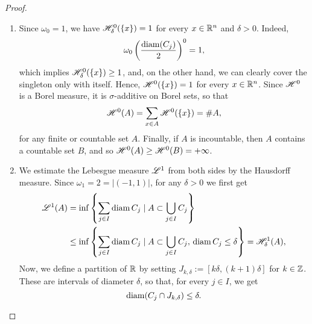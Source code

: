\begin{proof}~
\begin{enumerate}[(1)]
\item Since $\omega_0 = 1$, we have $\mathscr{H}^{0}_{\delta}(\{x\}) = 1$ for every $x \in \mathbb{R}^{n}$ and $\delta > 0$. Indeed, 
$$\omega_{0} \left(\frac{\operatorname{diam}(C_j)}{2}\right)^0 = 1,$$
which implies $\mathscr{H}^{0}_{\delta}(\{x\}) \ge 1$, and, on the other hand, we can clearly cover the singleton only with itself. Hence, $\mathscr{H}^{0}(\{x\}) = 1$ for every $x \in \mathbb{R}^{n}$. Since $\mathscr{H}^{0}$ is a Borel measure, it is $\sigma$-additive on Borel sets, so that
$$ \mathscr{H}^{0}(A) = \sum_{x \in A} \mathscr{H}^{0}(\{x\}) = \# A, $$
for any finite or countable set $A$. Finally, if $A$ is incountable, then $A$ contains a countable set $B$, and so $\mathscr{H}^{0}(A) \ge \mathscr{H}^{0}(B) = + \infty$.
\item We estimate the Lebesgue measure $\mathscr{L}^{1}$ from both sides by the
Hausdorff measure. Since $\omega_1 = 2 = |(-1,1)|$, for any $\delta > 0$ we first get 
\[
\begin{aligned}
\mathscr{L}^{1}(A) 
&= \inf \left\{ \sum_{j\in I} \operatorname{diam} C_j \mid A \subset \bigcup_{j\in I} C_j \right\}
\\ & \leq 
\inf \left\{ \sum_{j\in I} \operatorname{diam} C_j \mid A \subset \bigcup_{j\in I} C_j, \,
\operatorname{diam} C_j \leq \delta \right\}
= 
\mathscr{H}^{1}_\delta(A),
\end{aligned}
\]
Now, we define a partition of $\mathbb{R}$ by setting $J_{k,\delta} := [k\delta, (k+1)\delta]$
for $k \in \mathbb{Z}$. These are intervals of diameter
$\delta$, so that, for every $j \in I$, we get 
\begin{equation} \label{eq:diam_J_k_delta}
\operatorname{diam}(C_j \cap J_{k,\delta}) \leq \delta.
\end{equation}

\end{enumerate}
\end{proof}
